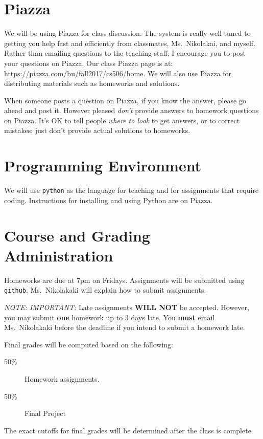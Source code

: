 \documentclass[11pt]{article}
\begin{document}
\section*{Piazza}

We will be using Piazza for class discussion. The system is really well
tuned to getting you help fast and efficiently from classmates, Ms.\ Nikolakai,
and myself. Rather than emailing questions to the teaching staff,
I encourage you to post your questions on Piazza.   Our class Piazza
page  is at: \url{https://piazza.com/bu/fall2017/cs506/home}. 
We will also use Piazza for distributing materials
such as homeworks and solutions.

When someone posts a question on Piazza, if you know the answer, please
go ahead and post it.   However pleased \emph{don't} provide answers to homework
questions on Piazza.   It's OK to tell people \emph{where to look} to
get answers, or to correct mistakes;  just don't provide actual solutions
to homeworks.

\section*{Programming Environment}

We will use \texttt{python} as the language for teaching and for
assignments that require coding.    Instructions for installing and
using Python are on Piazza.

\section*{Course and Grading Administration}

Homeworks are due at 7pm on Fridays.
Assignments will be submitted using \texttt{github}.   Ms.\ Nikolakaki will
explain how to submit assignments.  

\emph{NOTE: IMPORTANT:} Late assignments \textbf{WILL NOT} be accepted. 
However, you may submit \textbf{one} homework up to 3 days late.   You
\textbf{must} email Ms.\ Nikolakaki before the deadline if you intend to
submit a homework late. 

Final grades will be computed based on the following:
\begin{description}
\item[50\%] Homework assignments.  
\item[50\%] Final Project
\end{description}

The exact cutoffs for final grades will be determined after the class is
complete.
\end{document}
